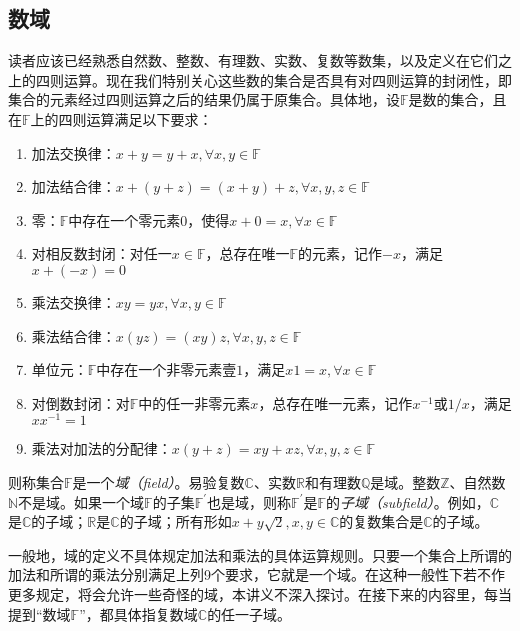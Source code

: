 \documentclass[../main.tex]{subfiles}
\begin{document}
\subsection{数域}\label{sec:II.2.1.1}
读者应该已经熟悉自然数、整数、有理数、实数、复数等数集，以及定义在它们之上的四则运算。现在我们特别关心这些数的集合是否具有对四则运算的封闭性，即集合的元素经过四则运算之后的结果仍属于原集合。具体地，设$\mathbb{F}$是数的集合，且在$\mathbb{F}$上的四则运算满足以下要求：
\begin{enumerate}
    \item 加法交换律：$x+y=y+x,\forall x,y\in\mathbb{F}$
    \item 加法结合律：$x+\left(y+z\right)=\left(x+y\right)+z,\forall x,y,z\in\mathbb{F}$
    \item 零：$\mathbb{F}$中存在一个零元素$0$，使得$x+0=x,\forall x\in\mathbb{F}$
    \item 对相反数封闭：对任一$x\in\mathbb{F}$，总存在唯一$\mathbb{F}$的元素，记作$-x$，满足$x+\left(-x\right)=0$
    \item 乘法交换律：$xy=yx,\forall x,y\in\mathbb{F}$
    \item 乘法结合律：$x\left(yz\right)=\left(xy\right)z,\forall x,y,z\in\mathbb{F}$
    \item 单位元：$\mathbb{F}$中存在一个非零元素壹$1$，满足$x1=x,\forall x\in\mathbb{F}$
    \item 对倒数封闭：对$\mathbb{F}$中的任一非零元素$x$，总存在唯一元素，记作$x^{-1}$或$1/x$，满足$xx^{-1}=1$
    \item 乘法对加法的分配律：$x\left(y+z\right)=xy+xz,\forall x,y,z\in\mathbb{F}$
\end{enumerate}
则称集合$\mathbb{F}$是一个\emph{域（field）}。易验复数$\mathbb{C}$、实数$\mathbb{R}$和有理数$\mathbb{Q}$是域。整数$\mathbb{Z}$、自然数$\mathbb{N}$不是域。如果一个域$\mathbb{F}$的子集$\mathbb{F}^\prime$也是域，则称$\mathbb{F}^\prime$是$\mathbb{F}$的\emph{子域（subfield）}。例如，$\mathbb{C}$是$\mathbb{C}$的子域；$\mathbb{R}$是$\mathbb{C}$的子域；所有形如$x+y\sqrt{2},x,y\in\mathbb{C}$的复数集合是$\mathbb{C}$的子域。

一般地，域的定义不具体规定加法和乘法的具体运算规则。只要一个集合上所谓的加法和所谓的乘法分别满足上列9个要求，它就是一个域。在这种一般性下若不作更多规定，将会允许一些奇怪的域，本讲义不深入探讨。在接下来的内容里，每当提到“数域$\mathbb{F}$”，都具体指复数域$\mathbb{C}$的任一子域。
\end{document}
